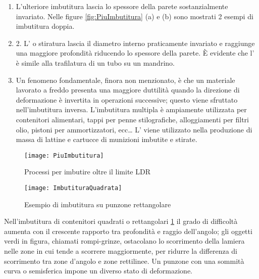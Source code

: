 \begin{enumerate}
\item L'ulteriore imbutitura lascia lo spessore della parete sostanzialmente invariato. Nelle 
figure \ref{fig:PiuImbutitura} (a) e (b) sono mostrati 2 esempi di imbutitura doppia. 
\item 2. L' o stiratura lascia il diametro interno praticamente invariato e raggiunge una maggiore profondità riducendo lo spessore della parete. È
evidente che l' è simile alla trafilatura di un tubo su un mandrino.
\item Un fenomeno fondamentale, finora non menzionato, è che un materiale lavorato a freddo presenta una maggiore duttilità quando la direzione di deformazione è invertita in operazioni successive; questo viene sfruttato nell'imbutitura inversa.
L'imbutitura multipla è ampiamente utilizzata per contenitori alimentari, tappi per penne stilografiche, alloggiamenti per filtri olio, pistoni per ammortizzatori, ecc\dots
L' viene utilizzato nella produzione di massa di lattine e cartucce di munizioni imbutite e stirate.
\end{enumerate}

\begin{figure}
\centering
\texttt{[image: PiuImbutitura]}
\caption{Processi per imbutire oltre il limite \ac{LDR}}
\label{fig:PiuImbutitura}
\texttt{[image: ImbutituraQuadrata]}
\caption{Esempio di imbutitura su punzone rettangolare}
\label{fig:ImbutituraQuadrata}
\end{figure}

Nell'imbutitura di contenitori quadrati o rettangolari \ref{fig:ImbutituraQuadrata} il grado di difficoltà aumenta con il crescente rapporto tra profondità e raggio dell'angolo; gli oggetti verdi in figura, chiamati rompi-grinze, ostacolano lo scorrimento della lamiera nelle zone in cui tende a scorrere maggiormente, per ridurre la differenza di scorrimento tra zone d'angolo e zone rettilinee.
Un punzone con una sommità curva o semisferica impone un diverso stato di deformazione.


